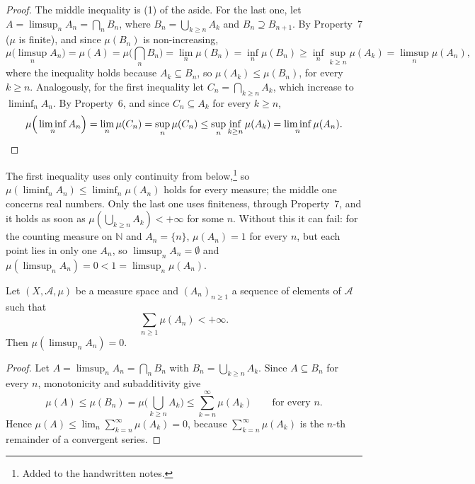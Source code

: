 \begin{proof}
The middle inequality is (1) of the aside. For the last one, let
$A=\limsup_nA_n=\bigcap_nB_n$, where $B_n=\bigcup_{k\ge n}A_k$ and $B_n\supseteq B_{n+1}$. By
Property~7 ($\mu$ is finite), and since $\mu(B_n)$ is non-increasing,
\[
  \mu\Big(\limsup_nA_n\Big)=\mu(A)=\mu\Big(\bigcap_nB_n\Big)=\lim_n\mu(B_n)=\inf_n\mu(B_n)
  \ge\inf_n\sup_{k\ge n}\mu(A_k)=\limsup_n\mu(A_n),
\]
where the inequality holds because $A_k\subseteq B_n$, so $\mu(A_k)\le\mu(B_n)$, for every
$k\ge n$. Analogously, for the first inequality let $C_n=\bigcap_{k\ge n}A_k$, which increase
to $\liminf_nA_n$. By Property~6, and since $C_n\subseteq A_k$ for every $k\ge n$,
\[
  \mu\Big(\liminf_nA_n\Big)=\lim_n\mu(C_n)=\sup_n\mu(C_n)\le\sup_n\inf_{k\ge n}\mu(A_k)
  =\liminf_n\mu(A_n). \qedhere
\]
\end{proof}

\begin{remark}\label{rem:ms-liminf-limsup-finite}
The first inequality uses only continuity from below,\footnote{Added to the handwritten notes.} so
$\mu(\liminf_nA_n)\le\liminf_n\mu(A_n)$ holds for every measure; the middle one concerns real
numbers. Only the last one uses finiteness, through Property~7, and it holds as soon as
$\mu(\bigcup_{k\ge n}A_k)<+\infty$ for some $n$. Without this it can fail: for the counting
measure on $\mathbb N$ and $A_n=\{n\}$, $\mu(A_n)=1$ for every $n$, but each point lies in
only one $A_n$, so $\limsup_nA_n=\emptyset$ and $\mu(\limsup_nA_n)=0<1=\limsup_n\mu(A_n)$.
\end{remark}

\begin{lemma}\label{lem:ms-borel-cantelli-1}
Let $(X,\mathcal A,\mu)$ be a measure space and $(A_n)_{n\ge1}$ a sequence of elements of
$\mathcal A$ such that
\[
  \sum_{n\ge1}\mu(A_n)<+\infty .
\]
Then $\mu(\limsup_nA_n)=0$.
\end{lemma}

\begin{proof}
Let $A=\limsup_nA_n=\bigcap_nB_n$ with $B_n=\bigcup_{k\ge n}A_k$. Since $A\subseteq B_n$ for
every $n$, monotonicity and subadditivity give
\[
  \mu(A)\le\mu(B_n)=\mu\Big(\bigcup_{k\ge n}A_k\Big)\le\sum_{k=n}^\infty\mu(A_k)
  \qquad\text{for every }n .
\]
Hence $\mu(A)\le\lim_n\sum_{k=n}^\infty\mu(A_k)=0$, because $\sum_{k=n}^\infty\mu(A_k)$ is the
$n$-th remainder of a convergent series.
\end{proof}

